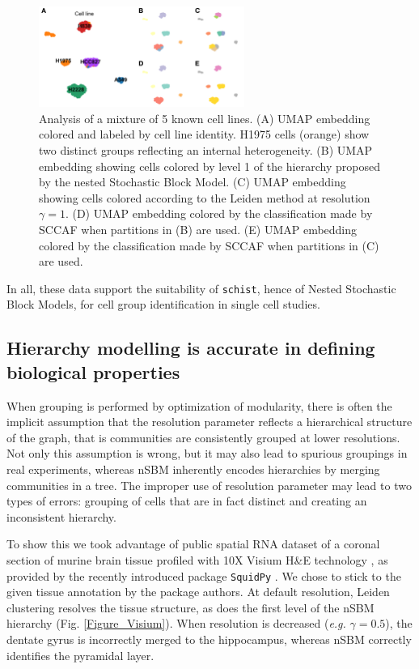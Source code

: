 \documentclass[10pt]{article}
\begin{document}
\begin{figure}[H]
\centering
\includegraphics[keepaspectratio,width=0.6\textwidth,height=\textheight]{FigureTian.png}
\caption[]{Analysis of a mixture of 5 known cell lines. (A) UMAP embedding colored and labeled by cell line identity. H1975 cells (orange) show two distinct groups reflecting an internal heterogeneity. (B) UMAP embedding showing cells colored by level 1 of the hierarchy proposed by the nested Stochastic Block Model. (C) UMAP embedding showing cells colored according to the Leiden method at resolution $\gamma = 1$. (D) UMAP embedding colored by the classification made by SCCAF when partitions in (B) are used. (E) UMAP embedding colored by the classification made by SCCAF when partitions in (C) are used.}\label{FigureTian}
\end{figure}

In all, these data support the suitability of \texttt{schist}, hence of Nested Stochastic Block Models, for cell group identification in single cell studies. 

\subsection*{Hierarchy modelling is accurate in defining biological properties}

When grouping is performed by optimization of modularity, there is often the implicit assumption that the resolution parameter reflects a hierarchical structure of the graph, that is communities are consistently grouped at lower resolutions. Not only this assumption is wrong, but it may also lead to spurious groupings in real experiments, whereas nSBM inherently encodes hierarchies by merging communities in a tree. The improper use of resolution parameter may lead to two types of errors: grouping of cells that are in fact distinct and creating an inconsistent hierarchy. 

To show this we took advantage of public spatial RNA dataset of a coronal section of murine brain tissue profiled with 10X Visium H\&E technology \cite{Gracia_Villacampa_2020}, as provided by the recently introduced package \texttt{SquidPy} \cite{Palla_Theis_2021}. We chose to stick to the given tissue annotation by the package authors. At default resolution, Leiden clustering resolves the tissue structure, as does the first level of the nSBM hierarchy (Fig. \ref{Figure_Visium}). When resolution is decreased (\emph{e.g.} $\gamma = 0.5$), the dentate gyrus is incorrectly merged to the hippocampus, whereas nSBM correctly identifies the pyramidal layer. 
\end{document}
